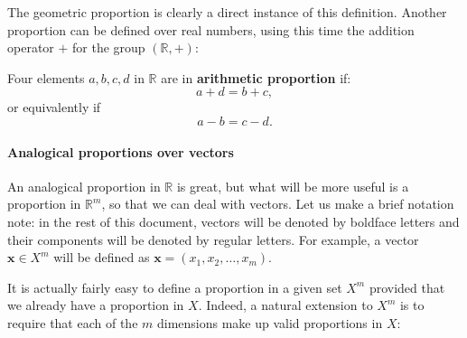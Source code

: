The geometric proportion is clearly a direct instance of this definition.
Another proportion can be defined over real numbers, using this time the
addition operator $+$ for the group $(\mathbb{R}, +)$:

\begin{definition}
  Four elements $a, b, c, d$ in $\mathbb{R}$ are in \textbf{arithmetic
  proportion} if:
  $$a + d = b + c,$$
  or equivalently if
  $$a - b = c - d.$$
\end{definition}

\paragraph{Analogical proportions over vectors\\}

An analogical proportion in $\mathbb{R}$ is great, but what will be more useful
is a proportion in $\mathbb{R}^m$, so that we can deal with vectors.  Let us
make a brief notation note: in the rest of this document, vectors will be
denoted by boldface letters and their components will be denoted by regular
letters. For example, a vector $\mathbf{x} \in X^m$ will be defined as
$\mathbf{x} = (x_1, x_2, \dots, x_m)$.

It is actually fairly easy to define a proportion in a given set $X^m$ provided
that we already have a proportion in $X$. Indeed, a natural extension to $X^m$
is to require that each of the $m$ dimensions make up valid proportions in $X$:

